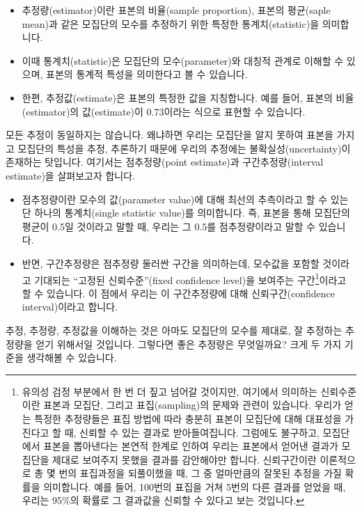 \documentclass[]{book}
\let\rmarkdownfootnote\footnote%
\def\footnote{\protect\rmarkdownfootnote}
\begin{document}
\begin{itemize}
\item
  추정량(estimator)이란 표본의 비율(sample proportion), 표본의 평균(saple mean)과 같은 모집단의 모수를 추정하기 위한 특정한 통계치(statistic)을 의미합니다.
\item
  이때 통계치(statistic)은 모집단의 모수(parameter)와 대칭적 관계로 이해할 수 있으며, 표본의 통계적 특성을 의미한다고 볼 수 있습니다.
\item
  한편, 추정값(estimate)은 표본의 특정한 값을 지칭합니다. 예를 들어, 표본의 비율(estimator)의 값(estimate)이 0.73이라는 식으로 표현할 수 있습니다.
\end{itemize}

모든 추정이 동일하지는 않습니다. 왜냐하면 우리는 모집단을 알지 못하여 표본을 가지고 모집단의 특성을 추정, 추론하기 때문에 우리의 추정에는 불확실성(uncertainty)이 존재하는 탓입니다. 여기서는 점추정량(point estimate)과 구간추정량(interval estimate)을 살펴보고자 합니다.

\begin{itemize}
\item
  점추정량이란 모수의 값(parameter value)에 대해 최선의 추측이라고 할 수 있는 단 하나의 통계치(single statistic value)를 의미합니다. 즉, 표본을 통해 모집단의 평균이 0.5일 것이라고 말할 때, 우리는 그 0.5를 점추정량이라고 말할 수 있습니다.
\item
  반면, 구간추정량은 점추정량 둘러싼 구간을 의미하는데, 모수값을 포함할 것이라고 기대되는 ``고정된 신뢰수준''(fixed confidence level)을 보여주는 구간\footnote{유의성 검정 부분에서 한 번 더 짚고 넘어갈 것이지만, 여기에서 의미하는 신뢰수준이란 표본과 모집단, 그리고 표집(sampling)의 문제와 관련이 있습니다. 우리가 얻는 특정한 추정량들은 표집 방법에 따라 충분히 표본이 모집단에 대해 대표성을 가진다고 할 때, 신뢰할 수 있는 결과로 받아들여집니다. 그럼에도 불구하고, 모집단에서 표본을 뽑아낸다는 본연적 한계로 인하여 우리는 표본에서 얻어낸 결과가 모집단을 제대로 보여주지 못했을 결과를 감안해야만 합니다. 신뢰구간이란 이론적으로 총 몇 번의 표집과정을 되풀이했을 때, 그 중 얼마만큼의 잘못된 추정을 가질 확률을 의미합니다. 예를 들어, 100번의 표집을 거쳐 5번의 다른 결과를 얻었을 때, 우리는 95\%의 확률로 그 결과값을 신뢰할 수 있다고 보는 것입니다.}이라고 할 수 있습니다. 이 점에서 우리는 이 구간추정량에 대해 신뢰구간(confidence interval)이라고 합니다.
\end{itemize}

추정, 추정량, 추정값을 이해하는 것은 아마도 모집단의 모수를 제대로, 잘 추정하는 추정량을 얻기 위해서일 것입니다. 그렇다면 좋은 추정량은 무엇일까요? 크게 두 가지 기준을 생각해볼 수 있습니다.
\end{document}
